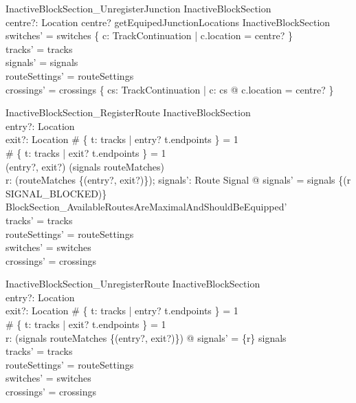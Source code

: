 \begin{schema}{InactiveBlockSection\_UnregisterJunction}
  \Delta InactiveBlockSection\\
  centre?: Location
\where
  centre? \in  getEquipedJunctionLocations \theta  InactiveBlockSection\\
  switches' = switches \nrres  \{  c: TrackContinuation | c.location = centre? \}\\
  tracks' = tracks\\
  signals' = signals\\
  routeSettings' = routeSettings\\
  crossings' = crossings \setminus  \{  cs: \finset  TrackContinuation | \exists  c: cs @ c.location = centre? \}
\end{schema}

\begin{schema}{InactiveBlockSection\_RegisterRoute}
  \Delta InactiveBlockSection\\
  entry?: Location\\
  exit?: Location
\where
  \# \{  t: tracks | entry? \in  t.endpoints \} = 1\\
  \# \{  t: tracks | exit? \in  t.endpoints \} = 1\\
  (entry?, exit?) \notin  \ran  (\dom  signals \dres  routeMatches)\\
  \exists  r: \dom  (routeMatches \rres  \{(entry?, exit?)\}); signals': Route \pfun  Signal @ signals' = signals \oplus  \{(r \mapsto  SIGNAL\_BLOCKED)\} \land  BlockSection\_AvailableRoutesAreMaximalAndShouldBeEquipped'\\
  tracks' = tracks\\
  routeSettings' = routeSettings\\
  switches' = switches\\
  crossings' = crossings
\end{schema}

\begin{schema}{InactiveBlockSection\_UnregisterRoute}
  \Delta InactiveBlockSection\\
  entry?: Location\\
  exit?: Location
\where
  \# \{  t: tracks | entry? \in  t.endpoints \} = 1\\
  \# \{  t: tracks | exit? \in  t.endpoints \} = 1\\
  \exists  r: \dom  (\dom  signals \dres  routeMatches \rres  \{(entry?, exit?)\}) @ signals' = \{r\} \ndres  signals\\
  tracks' = tracks\\
  routeSettings' = routeSettings\\
  switches' = switches\\
  crossings' = crossings
\end{schema}

